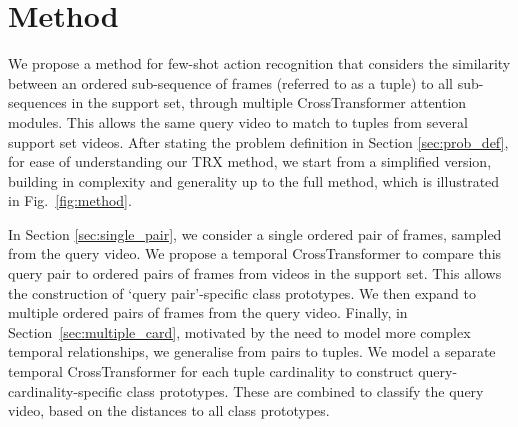 \documentclass[final]{cvpr}
\begin{document}
\section{Method} \label{sec:method}


We propose a method for few-shot action recognition that considers the similarity between an ordered sub-sequence of frames (referred to as a tuple) to all sub-sequences in the support set, through multiple CrossTransformer attention modules. This allows the same query video to match to tuples from several support set videos.
After stating the problem definition in Section \ref{sec:prob_def}, 
for ease of understanding our TRX method, we start from a simplified version, building in complexity and generality up to the full method, which is illustrated in Fig.~\ref{fig:method}.

In Section \ref{sec:single_pair}, we consider a single ordered pair of frames, sampled from the query video.  We propose a temporal CrossTransformer to compare this query pair to ordered pairs of frames from videos in the support set.  This allows the construction of  `query pair'-specific class prototypes.  
We then expand to multiple ordered pairs of frames from the query video. Finally, in Section~\ref{sec:multiple_card},
motivated by the need to model more complex temporal relationships, 
we generalise from pairs to tuples.  We model a separate temporal CrossTransformer for each tuple cardinality to construct query-cardinality-specific class prototypes. These are combined to classify the query video, based on the distances to all class prototypes. 
\end{document}
